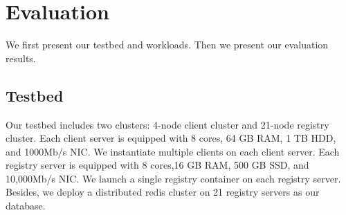 \section{ Evaluation}
\label{sec:Evaluation}


We first present our testbed and workloads.
Then we present our evaluation results.
\subsection{Testbed}

Our testbed includes two clusters: 
4-node client cluster and
21-node registry cluster.
Each client server is equipped with 8 cores, 64 GB RAM, 1 TB HDD, and 1000Mb/s NIC.
We instantiate multiple clients on each client server.
Each registry server is equipped with 8 cores,16 GB RAM, 500 GB SSD, and 10,000Mb/s NIC. 
We launch a single registry container on each registry server.
Besides,
we deploy a distributed redis cluster on 21 registry servers as our database.
